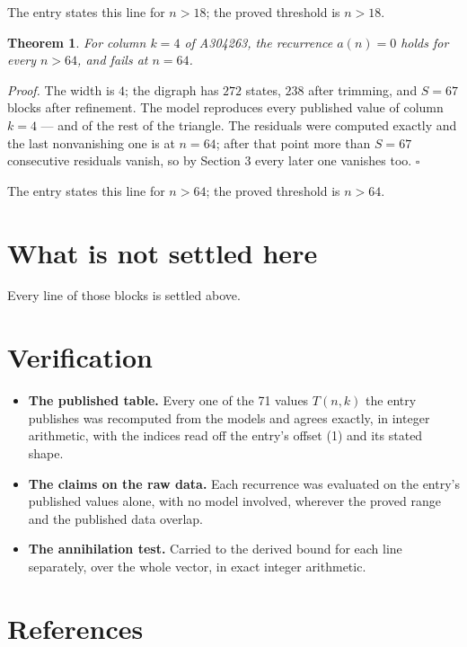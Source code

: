\documentclass[11pt]{article}
\newtheorem{theorem}{Theorem}
\theoremstyle{definition}
\begin{document}
The entry states this line for $n > 18$; the proved threshold is $n > 18$.

\begin{theorem} For column $k = 4$ of A304263, the recurrence $a(n) = 0$ holds for every $n > 64$, and fails at $n = 64$.\end{theorem}

{\itshape Proof.} The width is $4$; the digraph has $272$ states, $238$ after trimming, and $S = 67$ blocks after refinement. The model reproduces every published value of column $k = 4$ --- and of the rest of the triangle. The residuals were computed exactly and the last nonvanishing one is at $n = 64$; after that point more than $S = 67$ consecutive residuals vanish, so by Section 3 every later one vanishes too. $\square$

The entry states this line for $n > 64$; the proved threshold is $n > 64$.

\section{What is not settled here}

Every line of those blocks is settled above.

\section{Verification}

\begin{itemize}

\item {\bfseries The published table.} Every one of the 71 values $T(n,k)$ the entry publishes was recomputed from the models and agrees exactly, in integer arithmetic, with the indices read off the entry's offset (1) and its stated shape.

\item {\bfseries The claims on the raw data.} Each recurrence was evaluated on the entry's published values alone, with no model involved, wherever the proved range and the published data overlap.

\item {\bfseries The annihilation test.} Carried to the derived bound for each line separately, over the whole vector, in exact integer arithmetic.

\end{itemize}

\section{References}
\end{document}
